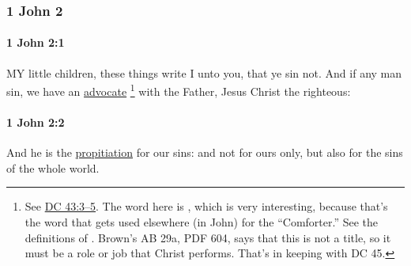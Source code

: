 	\subsubsection{1 John 2} %
		\label{1JOHN-2}
		
		\paragraph{1 John 2:1} %
			\label{1JOHN-2-1}
			
			MY little children, these things write I unto you, that ye sin not.  And if any man sin, we have an \hyperref[ADVOCATE]{advocate}%
				\footnote{%
					\label{1JOHN-2-1-advocate}%
					See \hyperref[DC45-3]{DC 43:3--5}. The word here is , which is very interesting, because that's the word that gets used elsewhere (in John) for the ``Comforter.'' See the definitions of \hyperref[PARAKLETOS]{}. Brown's AB 29a, PDF 604, says that this is not a title, so it must be a role or job that Christ performs. That's in keeping with DC 45.
					}
			with the Father, Jesus Christ the righteous:
			
			\begin{framed}
			\scriptsize
				\begin{compactdesc}
					\item[SBLG]  \hyperref[PARAKLETOS]{} 
				\end{compactdesc}
			\end{framed}

		\paragraph{1 John 2:2} %
			\label{1JOHN-2-2}

			And he is the \hyperref[PROPITIATION]{propitiation} for our sins: and not for ours only, but also for the sins of the whole world.

